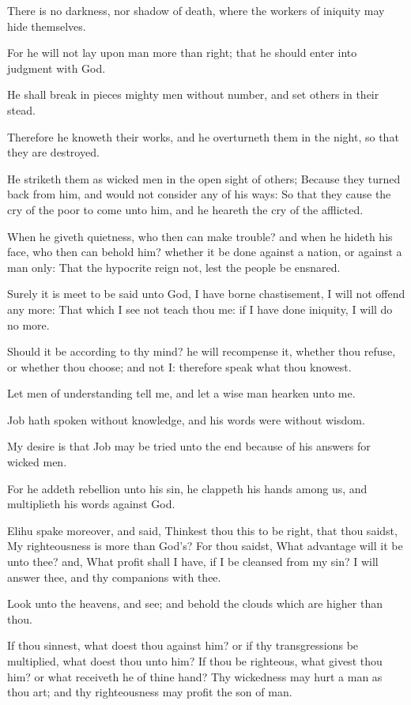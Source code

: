 \Verse There is no darkness, nor shadow of death, where the workers of iniquity may hide themselves.

\Verse For he will not lay upon man more than right; that he should enter into judgment with God.

\Verse He shall break in pieces mighty men without number, and set others in their stead.

\Verse Therefore he knoweth their works, and he overturneth them in the night, so that they are destroyed.

\Verse He striketh them as wicked men in the open sight of others; \Verse Because they turned back from him, and would not consider any of his ways: \Verse So that they cause the cry of the poor to come unto him, and he heareth the cry of the afflicted.

\Verse When he giveth quietness, who then can make trouble? and when he hideth his face, who then can behold him? whether it be done against a nation, or against a man only: \Verse That the hypocrite reign not, lest the people be ensnared.

\Verse Surely it is meet to be said unto God, I have borne chastisement, I will not offend any more: \Verse That which I see not teach thou me: if I have done iniquity, I will do no more.

\Verse Should it be according to thy mind? he will recompense it, whether thou refuse, or whether thou choose; and not I: therefore speak what thou knowest.

\Verse Let men of understanding tell me, and let a wise man hearken unto me.

\Verse Job hath spoken without knowledge, and his words were without wisdom.

\Verse My desire is that Job may be tried unto the end because of his answers for wicked men.

\Verse For he addeth rebellion unto his sin, he clappeth his hands among us, and multiplieth his words against God.


\Chapter
\Verse Elihu spake moreover, and said, \Verse Thinkest thou this to be right, that thou saidst, My righteousness is more than God's?  \Verse For thou saidst, What advantage will it be unto thee? and, What profit shall I have, if I be cleansed from my sin?  \Verse I will answer thee, and thy companions with thee.

\Verse Look unto the heavens, and see; and behold the clouds which are higher than thou.

\Verse If thou sinnest, what doest thou against him? or if thy transgressions be multiplied, what doest thou unto him?  \Verse If thou be righteous, what givest thou him? or what receiveth he of thine hand?  \Verse Thy wickedness may hurt a man as thou art; and thy righteousness may profit the son of man.

